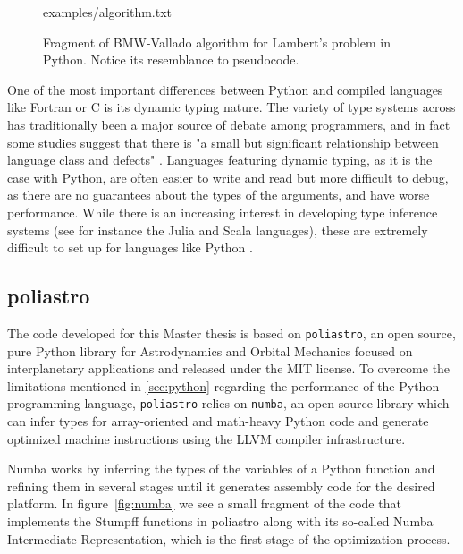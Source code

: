 \begin{figure}
\begin{lstinputlisting}[language=Python]{examples/algorithm.txt}
\end{lstinputlisting}
\caption{Fragment of BMW-Vallado algorithm for Lambert's problem in Python. Notice its resemblance to pseudocode.}
\label{fig:python}
\end{figure}

One of the most important differences between Python and compiled languages like Fortran or C is its dynamic typing nature. The variety of type systems across has traditionally been a major source of debate among programmers, and in fact some studies suggest that there is "a small but significant relationship between language class and defects" \cite{ray2014quality}. Languages featuring dynamic typing, as it is the case with Python, are often easier to write and read but more difficult to debug, as there are no guarantees about the types of the arguments, and have worse performance. While there is an increasing interest in developing type inference systems (see for instance the Julia and Scala languages), these are extremely difficult to set up for languages like Python \cite{cannon2005localized}.

\subsection{poliastro}

The code developed for this Master thesis is based on \verb|poliastro|, an open source, pure Python library for Astrodynamics and Orbital Mechanics focused on interplanetary applications and released under the MIT license\cite{cano2017poliastro}. To overcome the limitations mentioned in \ref{sec:python} regarding the performance of the Python programming language, \verb|poliastro| relies on \verb|numba|, an open source library which can infer types for array-oriented and math-heavy Python code and generate optimized machine instructions using the LLVM compiler infrastructure.

Numba works by inferring the types of the variables of a Python function and refining them in several stages until it generates assembly code for the desired platform. In figure~\ref{fig:numba} we see a small fragment of the code that implements the Stumpff functions in poliastro along with its so-called Numba Intermediate Representation, which is the first stage of the optimization process.
% 
% 

